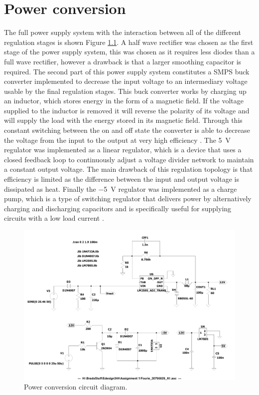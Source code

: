 \chapter{Power conversion}\label{ch:power_conversion}

The full power supply system with the interaction between all of the different regulation stages is shown Figure \ref{fig:circuit_diagram_power}. A half wave rectifier was chosen as the first stage of the power supply system, this was chosen as it requires less diodes than a full wave rectifier, however a drawback is that a larger smoothing capacitor is required. The second part of this power supply system constitutes a SMPS buck converter implemented to decrease the input voltage to an intermediary voltage usable by the final regulation stages. This buck converter works by charging up an inductor, which stores energy in the form of a magnetic field. If the voltage supplied to the inductor is removed it will reverse the polarity of its voltage and will supply the load with the energy stored in its magnetic field. Through this constant switching between the on and off state the converter is able to decrease the voltage from the input to the output at very high efficiency \cite{Gao:2015}.\vspace{4mm} \newline
The \SI{5}{V} regulator was implemented as a linear regulator, which is a device that uses a closed feedback loop to continuously adjust a voltage divider network to maintain a constant output voltage. The main drawback of this regulation topology is that efficiency is limited as the difference between the input and output voltage is dissipated as heat. Finally the \SI{-5}{V} regulator was implemented as a charge pump, which is a type of switching regulator that delivers power by alternatively charging and discharging capacitors and is specifically useful for supplying circuits with a low load current \cite{WebsiteChargePump}.

\begin{figure}[!ht]
  \centering
 \footnotesize
        \includegraphics[width=0.75\linewidth]{./Figures/circuit_diagram_power.pdf}
		    \caption{Power conversion circuit diagram.} \label{fig:circuit_diagram_power}
 \end{figure}
